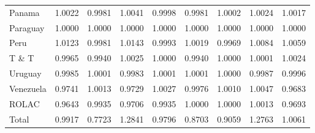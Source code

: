 \documentclass[energies,article,accept,moreauthors,12pt,a4paper]{mdpi} %
\begin{document}
\begin{table}[!h]
\begin{center}
\begin{tabular}{l|c|c:c|ccc:cc}
 Panama 	 & 	1.0022 	 & 	0.9981 	&	1.0041 	&	0.9998 	&	0.9981 	&	1.0002 	&	1.0024 	&	1.0017 	\\
 Paraguay 	 & 	1.0000 	 & 	1.0000 	&	1.0000 	&	1.0000 	&	1.0000 	&	1.0000 	&	1.0000 	&	1.0000 	\\
 Peru 	 & 	1.0123 	 & 	0.9981 	&	1.0143 	&	0.9993 	&	1.0019 	&	0.9969 	&	1.0084 	&	1.0059 	\\
 T \& T 	 & 	0.9965 	 & 	0.9940 	&	1.0025 	&	1.0000 	&	0.9940 	&	1.0000 	&	1.0001 	&	1.0024 	\\
 Uruguay 	 & 	0.9985 	 & 	1.0001 	&	0.9983 	&	1.0001 	&	1.0001 	&	1.0000 	&	0.9987 	&	0.9996 	\\
 Venezuela 	 & 	0.9741 	 & 	1.0013 	&	0.9729 	&	1.0027 	&	0.9976 	&	1.0010 	&	1.0047 	&	0.9683 	\\
 ROLAC 	 & 	0.9643 	 & 	0.9935 	&	0.9706 	&	0.9935 	&	1.0000 	&	1.0000 	&	1.0013 	&	0.9693 	\\\hline
Total	 & 	0.9917 	 & 	0.7723 	&	1.2841 	&	0.9796 	&	0.8703 	&	0.9059 	&	1.2763 	&	1.0061 		
\end{tabular}	\label{table4}									
\end{center}										
\end{table}	
\end{document}
